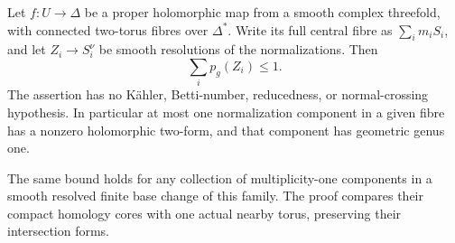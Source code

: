 
\begin{proposition}\label{cdp:st:C.2.UN.28}
Let $f:U\to\Delta$ be a proper holomorphic map from a
smooth complex threefold, with connected two-torus
fibres over $\Delta^*$. Write its full central fibre
as $\sum_i m_iS_i$, and let $Z_i\to S_i^\nu$ be
smooth resolutions of the normalizations. Then
\[
                         \sum_i p_g(Z_i)\le1.
                                                               \tag{C.PG.1}\label{cdp:eq:C.PG.1}
\]
The assertion has no K\"ahler, Betti-number, reducedness,
or normal-crossing hypothesis. In particular at most
one normalization component in a given fibre has a
nonzero holomorphic two-form, and that component has
geometric genus one.

The same bound holds for any collection of multiplicity-one
components in a smooth resolved finite base change of
this family. The proof compares their compact homology
cores with one actual nearby torus, preserving their
intersection forms.
\end{proposition}

